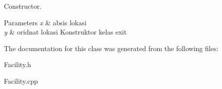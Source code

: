 Constructor. 


\begin{DoxyParams}{Parameters}
{\em x} & absis lokasi \\
\hline
{\em y} & oridnat lokasi Konstruktor kelas exit \\
\hline
\end{DoxyParams}


The documentation for this class was generated from the following files\+:\begin{DoxyCompactItemize}
\item 
Facility.\+h\item 
Facility.\+cpp\end{DoxyCompactItemize}
